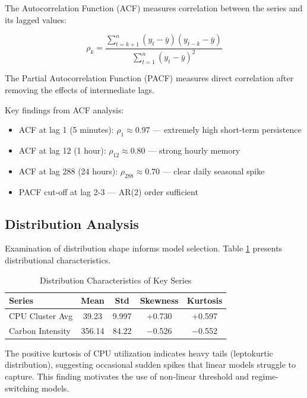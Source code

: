 \documentclass[12pt]{report}
\begin{document}
The Autocorrelation Function (ACF) measures correlation between the series and its lagged values:

\begin{equation}
\rho_k = \frac{\sum_{t=k+1}^{n}(y_t - \bar{y})(y_{t-k} - \bar{y})}{\sum_{t=1}^{n}(y_t - \bar{y})^2}
\end{equation}

The Partial Autocorrelation Function (PACF) measures direct correlation after removing the effects of intermediate lags.

Key findings from ACF analysis:
\begin{itemize}
    \item ACF at lag 1 (5 minutes): $\rho_1 \approx 0.97$ --- extremely high short-term persistence
    \item ACF at lag 12 (1 hour): $\rho_{12} \approx 0.80$ --- strong hourly memory
    \item ACF at lag 288 (24 hours): $\rho_{288} \approx 0.70$ --- clear daily seasonal spike
    \item PACF cut-off at lag 2-3 --- AR(2) order sufficient
\end{itemize}

\subsection{Distribution Analysis}

Examination of distribution shape informs model selection. Table \ref{tab:distribution} presents distributional characteristics.

\begin{table}[H]
\centering
\caption{Distribution Characteristics of Key Series}
\label{tab:distribution}
\begin{tabular}{lcccc}
\toprule
\textbf{Series} & \textbf{Mean} & \textbf{Std} & \textbf{Skewness} & \textbf{Kurtosis} \\
\midrule
CPU Cluster Avg & 39.23 & 9.997 & +0.730 & +0.597 \\
Carbon Intensity & 356.14 & 84.22 & $-$0.526 & $-$0.552 \\
\bottomrule
\end{tabular}
\end{table}

The positive kurtosis of CPU utilization indicates heavy tails (leptokurtic distribution), suggesting occasional sudden spikes that linear models struggle to capture. This finding motivates the use of non-linear threshold and regime-switching models.
\end{document}
